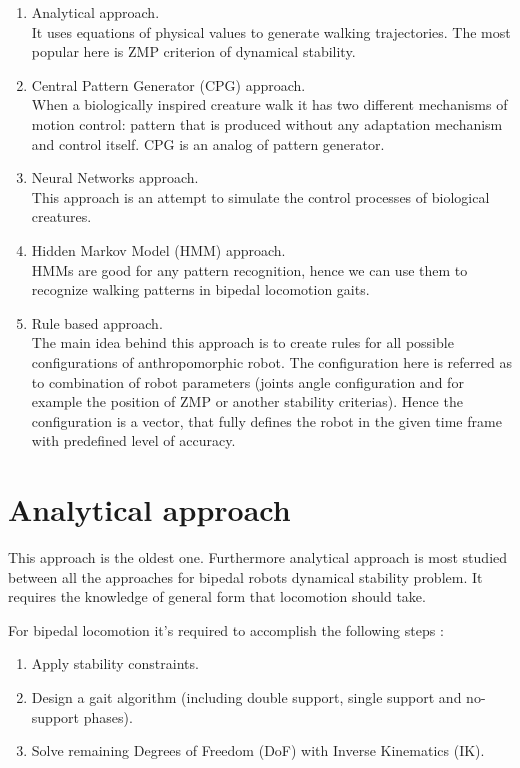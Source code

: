 \documentclass[12pt,a4paper]{report}
\begin{document}
		\begin{enumerate}
			\item Analytical approach.\\ It uses equations of physical values to generate walking trajectories. The most popular here is ZMP criterion of dynamical stability.
			\item Central Pattern Generator (CPG) approach.\\ When a biologically inspired creature walk it has two different mechanisms of motion control: pattern that is produced without any adaptation mechanism and control  itself. CPG is an analog of pattern generator.
			\item Neural Networks approach.\\ This approach is an attempt to simulate the control processes of biological creatures.
			\item Hidden Markov Model (HMM) approach.\\ HMMs are good for any pattern recognition, hence we can use them to recognize walking patterns in bipedal locomotion gaits.
			\item Rule based approach.\\ The main idea behind this approach is to create rules for all possible configurations of anthropomorphic robot. The configuration here is referred as to combination of robot parameters (joints angle configuration and for example the position of ZMP or another stability criterias). Hence the configuration is a vector, that fully defines the robot in the given time frame with predefined level of accuracy.
		\end{enumerate}

		\section{Analytical approach}
			This approach is the oldest one. Furthermore analytical approach is most studied between all the approaches for bipedal robots dynamical stability problem. It requires the knowledge of general form that locomotion should take.

		For bipedal locomotion it's required to accomplish the following steps \cite{wright2014intelligent}:
		\begin{enumerate}
			\item Apply stability constraints.
			\item Design a gait algorithm (including double support, single support and no-support phases).
			\item Solve remaining Degrees of Freedom (DoF) with Inverse Kinematics (IK).
		\end{enumerate}
		
\end{document}
